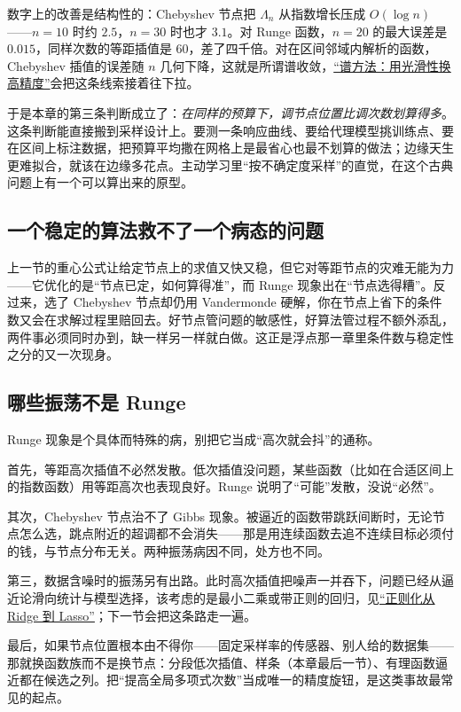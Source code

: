 数字上的改善是结构性的：Chebyshev 节点把 \(\Lambda_n\) 从指数增长压成 \(O(\log n)\)——\(n=10\) 时约 \(2.5\)，\(n=30\) 时也才 \(3.1\)。对 Runge 函数，\(n=20\) 的最大误差是 \(0.015\)，同样次数的等距插值是 \(60\)，差了四千倍。对在区间邻域内解析的函数，Chebyshev 插值的误差随 \(n\) 几何下降，这就是所谓谱收敛，\hyperref[sec:08-Numerical-Analysis/08-Fourier-and-Spectral-Methods/04]{``谱方法：用光滑性换高精度''}会把这条线索接着往下拉。

于是本章的第三条判断成立了：\emph{在同样的预算下，调节点位置比调次数划算得多}。这条判断能直接搬到采样设计上。要测一条响应曲线、要给代理模型挑训练点、要在区间上标注数据，把预算平均撒在网格上是最省心也最不划算的做法；边缘天生更难拟合，就该在边缘多花点。主动学习里``按不确定度采样''的直觉，在这个古典问题上有一个可以算出来的原型。

\subsection{一个稳定的算法救不了一个病态的问题}

上一节的重心公式让给定节点上的求值又快又稳，但它对等距节点的灾难无能为力——它优化的是``节点已定，如何算得准''，而 Runge 现象出在``节点选得糟''。反过来，选了 Chebyshev 节点却仍用 Vandermonde 硬解，你在节点上省下的条件数又会在求解过程里赔回去。好节点管问题的敏感性，好算法管过程不额外添乱，两件事必须同时办到，缺一样另一样就白做。这正是浮点那一章里条件数与稳定性之分的又一次现身。

\subsection{哪些振荡不是 Runge}

Runge 现象是个具体而特殊的病，别把它当成``高次就会抖''的通称。

首先，等距高次插值不必然发散。低次插值没问题，某些函数（比如在合适区间上的指数函数）用等距高次也表现良好。Runge 说明了``可能''发散，没说``必然''。

其次，Chebyshev 节点治不了 Gibbs 现象。被逼近的函数带跳跃间断时，无论节点怎么选，跳点附近的超调都不会消失——那是用连续函数去追不连续目标必须付的钱，与节点分布无关。两种振荡病因不同，处方也不同。

第三，数据含噪时的振荡另有出路。此时高次插值把噪声一并吞下，问题已经从逼近论滑向统计与模型选择，该考虑的是最小二乘或带正则的回归，见\hyperref[sec:13-Machine-Learning/02-Linear-Models/02]{``正则化从 Ridge 到 Lasso''}；下一节会把这条路走一遍。

最后，如果节点位置根本由不得你——固定采样率的传感器、别人给的数据集——那就换函数族而不是换节点：分段低次插值、样条（本章最后一节）、有理函数逼近都在候选之列。把``提高全局多项式次数''当成唯一的精度旋钮，是这类事故最常见的起点。


